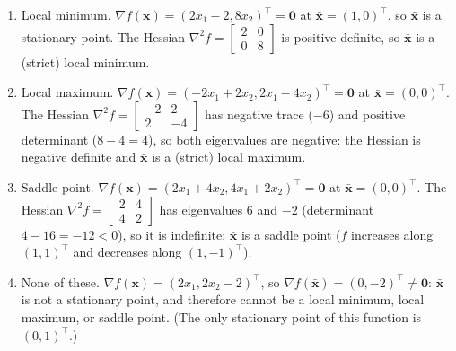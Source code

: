 \begin{solution}
    
    \begin{enumerate}[label=(\alph*)]
        \item Local minimum. $\nabla f(\mathbf{x}) = (2x_1 - 2, 8x_2)^\top = \mathbf{0}$ at $\bar{\mathbf{x}} = (1,0)^\top$, so $\bar{\mathbf{x}}$ is a stationary point. The Hessian $\nabla^2 f = \begin{bmatrix} 2 & 0 \\ 0 & 8 \end{bmatrix}$ is positive definite, so $\bar{\mathbf{x}}$ is a (strict) local minimum.
        \item Local maximum. $\nabla f(\mathbf{x}) = (-2x_1 + 2x_2, 2x_1 - 4x_2)^\top = \mathbf{0}$ at $\bar{\mathbf{x}} = (0,0)^\top$. The Hessian $\nabla^2 f = \begin{bmatrix} -2 & 2 \\ 2 & -4 \end{bmatrix}$ has negative trace ($-6$) and positive determinant ($8 - 4 = 4$), so both eigenvalues are negative: the Hessian is negative definite and $\bar{\mathbf{x}}$ is a (strict) local maximum.
        \item Saddle point. $\nabla f(\mathbf{x}) = (2x_1 + 4x_2, 4x_1 + 2x_2)^\top = \mathbf{0}$ at $\bar{\mathbf{x}} = (0,0)^\top$. The Hessian $\nabla^2 f = \begin{bmatrix} 2 & 4 \\ 4 & 2 \end{bmatrix}$ has eigenvalues $6$ and $-2$ (determinant $4 - 16 = -12 < 0$), so it is indefinite: $\bar{\mathbf{x}}$ is a saddle point ($f$ increases along $(1,1)^\top$ and decreases along $(1,-1)^\top$).
        \item None of these. $\nabla f(\mathbf{x}) = (2x_1, 2x_2 - 2)^\top$, so $\nabla f(\bar{\mathbf{x}}) = (0, -2)^\top \neq \mathbf{0}$: $\bar{\mathbf{x}}$ is not a stationary point, and therefore cannot be a local minimum, local maximum, or saddle point. (The only stationary point of this function is $(0,1)^\top$.)
    \end{enumerate}
    
\end{solution}


